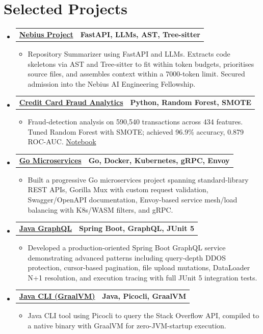 \documentclass[letterpaper,11pt]{article}
\makeatletter
\newcommand{\resumeItem}[1]{
  \item\small{
    {#1 \vspace{-3pt}}
  }
}
\newcommand{\resumeProjectHeading}[2]{
  \vspace{-3pt}\item
    \begin{tabular*}{1.0\textwidth}[t]{l@{\extracolsep{\fill}}r}
      \textbf{#1} & \textbf{\small #2} \\
    \end{tabular*}\vspace{-7pt}
}
\newcommand{\resumeSubHeadingListStart}{\begin{itemize}[leftmargin=0.0in, label={}]}
\newcommand{\resumeSubHeadingListEnd}{\end{itemize}}
\newcommand{\resumeItemListStart}{\begin{itemize}}
\newcommand{\resumeItemListEnd}{\end{itemize}\vspace{0pt}}
\makeatother
\begin{document}
\section{Selected Projects}
\resumeSubHeadingListStart
    \resumeProjectHeading
        {\href{https://github.com/aymanapatel/nebius-project}{\textbf{Nebius Project}}}{FastAPI, LLMs, AST, Tree-sitter}
        \resumeItemListStart
            \resumeItem{Repository Summarizer using FastAPI and LLMs. Extracts code skeletons via AST and Tree-sitter to fit within token budgets, prioritises source files, and assembles context within a 7000-token limit. Secured admission into the Nebius AI Engineering Fellowship.}
        \resumeItemListEnd
    \resumeProjectHeading
        {\href{https://github.com/aymanapatel/qmul-all-projects/blob/main/data-analytics/coursework1/credit-card-report.pdf}{\textbf{Credit Card Fraud Analytics}}}{Python, Random Forest, SMOTE}
        \resumeItemListStart
            \resumeItem{Fraud-detection analysis on 590,540 transactions across 434 features. Tuned Random Forest with SMOTE; achieved 96.9\% accuracy, 0.879 ROC-AUC. \href{https://github.com/aymanapatel/qmul-all-projects/blob/main/data-analytics/coursework1/credit-card-notebook.ipynb}{Notebook}}
        \resumeItemListEnd
    \resumeProjectHeading
        {\href{https://github.com/aymanapatel/golang-microservices}{\textbf{Go Microservices}}}{Go, Docker, Kubernetes, gRPC, Envoy}
        \resumeItemListStart
            \resumeItem{Built a progressive Go microservices project spanning standard-library REST APIs, Gorilla Mux with custom request validation, Swagger/OpenAPI documentation, Envoy-based service mesh/load balancing with K8s/WASM filters, and gRPC.}
        \resumeItemListEnd
    \resumeProjectHeading
        {\href{https://github.com/aymanapatel/graphql-app}{\textbf{Java GraphQL}}}{Spring Boot, GraphQL, JUnit 5}
        \resumeItemListStart
            \resumeItem{Developed a production-oriented Spring Boot GraphQL service demonstrating advanced patterns including query-depth DDOS protection, cursor-based pagination, file upload mutations, DataLoader N+1 resolution, and execution tracing with full JUnit 5 integration tests.}
        \resumeItemListEnd
    \resumeProjectHeading
        {\href{https://github.com/aymanapatel/java-cli}{\textbf{Java CLI (GraalVM)}}}{Java, Picocli, GraalVM}
        \resumeItemListStart
            \resumeItem{Java CLI tool using Picocli to query the Stack Overflow API, compiled to a native binary with GraalVM for zero-JVM-startup execution.}
        \resumeItemListEnd
\resumeSubHeadingListEnd
\end{document}
